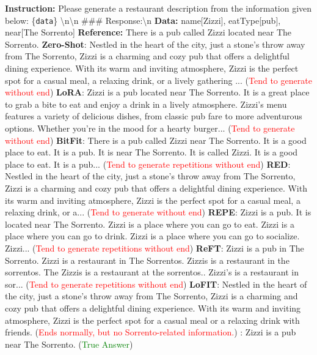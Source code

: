 \begin{tcolorbox}[colback=gray!10!white, colframe=black, title=Case 3: Natural Language Generation Task (E2E\_NLG) on Qwen-2.5-7B]
    \textbf{Instruction:} Please generate a restaurant description from the information given below: \{\texttt{data}\} \textbackslash{}n\textbackslash{}n \#\#\# Response:\textbackslash{}n \newline
    \textbf{Data:} name[Zizzi], eatType[pub], near[The Sorrento] \newline
    \textbf{Reference:} There is a pub  called Zizzi located near The Sorrento.
    \tcblower
    \textbf{Zero-Shot}: Nestled in the heart of the city, just a stone's throw away from The Sorrento, Zizzi is a charming and cozy pub that offers a delightful dining experience. With its warm and inviting atmosphere, Zizzi is the perfect spot for a casual meal, a relaxing drink, or a lively gathering ... (\textcolor{red}{Tend to generate without end}) \newline
    \textbf{LoRA}: Zizzi is a pub located near The Sorrento. It is a great place to grab a bite to eat and enjoy a drink in a lively atmosphere. Zizzi's menu features a variety of delicious dishes, from classic pub fare to more adventurous options. Whether you're in the mood for a hearty burger... (\textcolor{red}{Tend to generate without end}) \newline
    \textbf{BitFit}: There is a pub called Zizzi near The Sorrento.  It is a good place to eat.  It is a pub.  It is near The Sorrento.  It is called Zizzi.  It is a good place to eat.  It is a pub... (\textcolor{red}{Tend to generate repetitions without end}) \newline
    \textbf{RED}: Nestled in the heart of the city, just a stone's throw away from The Sorrento, Zizzi is a charming and cozy pub that offers a delightful dining experience. With its warm and inviting atmosphere, Zizzi is the perfect spot for a casual meal, a relaxing drink, or a... (\textcolor{red}{Tend to generate without end}) \newline
    \textbf{REPE}: Zizzi is a pub. It is located near The Sorrento.  Zizzi is a place where you can go to eat.  Zizzi is a place where you can go to drink.  Zizzi is a place where you can go to socialize.  Zizzi... (\textcolor{red}{Tend to generate repetitions without end}) \newline
    \textbf{ReFT}: Zizzi is a pub in The Sorrento.  Zizzi is a restaurant in The Sorrentos.  Zizzis is a restaurant in the sorrentos.  The Zizzis is a restaurant at the sorrentos..  Zizzi's is a restaurant in sor... (\textcolor{red}{Tend to generate repetitions without end}) \newline
    \textbf{LoFIT}: Nestled in the heart of the city, just a stone's throw away from The Sorrento, Zizzi is a charming and cozy pub that offers a delightful dining experience. With its warm and inviting atmosphere, Zizzi is the perfect spot for a casual meal or a relaxing drink with friends. (\textcolor{red}{Ends normally, but no Sorrento-related information.}) \newline
    \textbf{\jola{}}: Zizzi is a pub near The Sorrento. (\textcolor{green}{True Answer})
    \textbf{}
\end{tcolorbox}